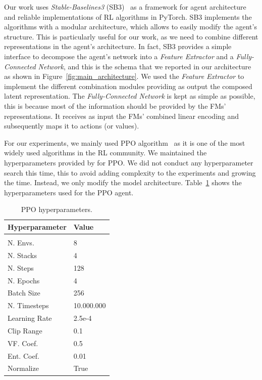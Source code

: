 Our work uses \textit{Stable-Baselines3} (SB3)~\citep{stable-baselines3} as a framework for agent architecture and reliable implementations of RL algorithms in PyTorch.
SB3 implements the algorithms with a modular architecture, which allows to easily modify the agent's structure.
This is particularly useful for our work, as we need to combine different representations in the agent's architecture.
In fact, SB3 provides a simple interface to decompose the agent's network into a \textit{Feature Extractor} and a \textit{Fully-Connected Network}, and this is the schema that we reported in our architecture as shown in Figure~\ref{fig:main_architecture}.
We used the \textit{Feature Extractor} to implement the different combination modules providing as output the composed latent representation.
The \textit{Fully-Connected Network} is kept as simple as possible, this is because most of the information should be provided by the FMs' representations.
It receives as input the FMs' combined linear encoding and subsequently maps it to actions (or values).

For our experiments, we mainly used PPO algorithm~\citep{schulman2017proximal} as it is one of the most widely used algorithms in the RL community.
We maintained the hyperparameters provided by \citet{rl-zoo3} for PPO.
We did not conduct any hyperparameter search this time, this to avoid adding complexity to the experiments and growing the time.
Instead, we only modify the model architecture.
Table~\ref{tab:ppo_hyperparams} shows the hyperparameters used for the PPO agent.

\begin{table}[htbp]
    \centering
        \begin{tabular}{ll}
            \multicolumn{1}{l}{\bf Hyperparameter}  &\multicolumn{1}{l}{\bf Value}
            \\ \hline \\
            N. Envs.       & 8 \\
            N. Stacks      & 4 \\
            N. Steps       & 128 \\
            N. Epochs      & 4 \\
            Batch Size     & 256 \\
            N. Timesteps   & 10.000.000 \\
            Learning Rate  & 2.5e-4 \\
            Clip Range     & 0.1 \\
            VF. Coef.      & 0.5 \\
            Ent. Coef.     & 0.01 \\
            Normalize      & True \\
        \end{tabular}
        \caption{PPO hyperparameters.} \label{tab:ppo_hyperparams}
\end{table}

